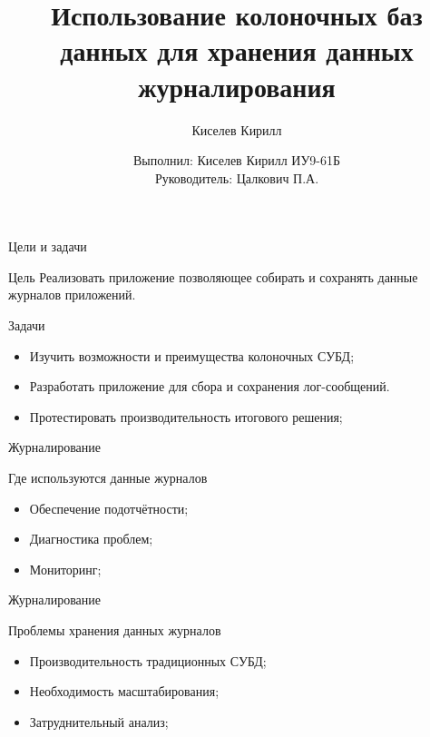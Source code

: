 \documentclass{beamer}
\title{Использование колоночных баз данных для хранения данных журналирования}
\author{Киселев Кирилл}
\author[me]{Выполнил: Киселев Кирилл ИУ9-61Б\\[1mm]Руководитель: Цалкович П.А.}
\begin{document}
\maketitle

\begin{frame}{Цели и задачи}
	\begin{alertblock}{Цель}
		Реализовать приложение позволяющее собирать и сохранять данные журналов приложений.
	\end{alertblock}
	\begin{alertblock}{Задачи}
		\begin{itemize}
			\item Изучить возможности и преимущества колоночных СУБД;
			\item Разработать приложение для сбора и сохранения лог-сообщений.
			\item Протестировать производительность итогового решения;
		\end{itemize}
	\end{alertblock}
\end{frame}


\begin{frame}{Журналирование}
	\begin{alertblock}{Где используются данные журналов}
		\begin{itemize}
			\item Обеспечение подотчётности;
			\item Диагностика проблем;
			\item Мониторинг;
		\end{itemize}
	\end{alertblock}
\end{frame}


\begin{frame}{Журналирование}
	\begin{alertblock}{Проблемы хранения данных журналов}
		\begin{itemize}
			\item Производительность традиционных СУБД;
			\item Необходимость масштабирования;
			\item Затруднительный анализ;
		\end{itemize}
	\end{alertblock}
\end{frame}
\end{document}
